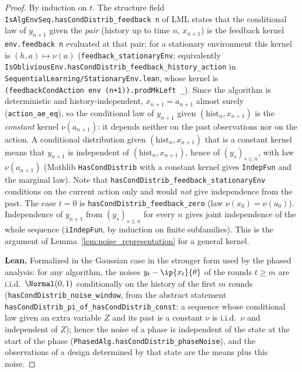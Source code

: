 \begin{proof}
\leanok
By induction on $t$. The structure field \texttt{IsAlgEnvSeq.hasCondDistrib\_feedback n} of
LML states that the conditional law of $y_{n+1}$ given the \emph{pair} (history up to time
$n$, $x_{n+1}$) is the feedback kernel \texttt{env.feedback n} evaluated at that pair; for a
stationary environment this kernel is $(h,a)\mapsto\nu(a)$ (\texttt{feedback\_stationaryEnv};
equivalently \texttt{IsObliviousEnv.hasCondDistrib\_feedback\_history\_action} in
\texttt{SequentialLearning/StationaryEnv.lean}, whose kernel is
\texttt{(feedbackCondAction env (n+1)).prodMkLeft \_}). Since the algorithm is deterministic
and history-independent, $x_{n+1} = a_{n+1}$ almost surely (\texttt{action\_ae\_eq}), so the
conditional law of $y_{n+1}$ given $(\mathrm{hist}_n, x_{n+1})$ is the \emph{constant} kernel
$\nu(a_{n+1})$: it depends neither on the past observations nor on the action. A conditional
distribution given $(\mathrm{hist}_n,x_{n+1})$ that is a constant kernel means that $y_{n+1}$
is independent of $(\mathrm{hist}_n,x_{n+1})$, hence of $(y_s)_{s\le n}$, with law
$\nu(a_{n+1})$ (Mathlib \texttt{HasCondDistrib} with a constant kernel gives \texttt{IndepFun}
and the marginal law). Note that \texttt{hasCondDistrib\_feedback\_stationaryEnv} conditions
on the current action only and would \emph{not} give independence from the past. The case
$t = 0$ is \texttt{hasCondDistrib\_feedback\_zero} (law $\nu(x_0) = \nu(a_0)$). Independence of
$y_{n+1}$ from $(y_s)_{s\le n}$ for every $n$ gives joint independence of the whole sequence
(\texttt{iIndepFun}, by induction on finite subfamilies). This is the argument of
Lemma~\ref{lem:noise_representation} for a general kernel.

\textbf{Lean.} Formalized in the Gaussian case in the stronger form used by the phased
analysis: for any algorithm, the noises $y_t - \ip{x_t}{\theta}$ of the rounds $t \ge m$ are
i.i.d.\ $\Normal(0,1)$ conditionally on the history of the first $m$ rounds
(\texttt{hasCondDistrib\_noise\_window}, from the abstract statement
\texttt{hasCondDistrib\_pi\_of\_hasCondDistrib\_const}: a sequence whose conditional law
given an extra variable $Z$ and its past is a constant $\nu$ is i.i.d.\ $\nu$ and independent
of $Z$); hence the noise of a phase is independent of the state at the start of the phase
(\texttt{PhasedAlg.hasCondDistrib\_phaseNoise}), and the observations of a design determined
by that state are the means plus this noise.
\end{proof}

